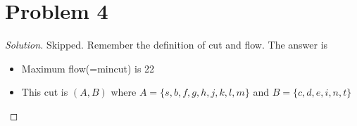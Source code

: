 \section*{Problem 4}
	\begin{proof} [Solution]
		Skipped. Remember the definition of cut and flow. The answer is
		\begin{itemize}
			\item Maximum flow(=mincut) is 22
			\item This cut is $(A, B)$ where $A = \{s, b, f, g, h, j, k, l, m\}$ and $B = 
			\{c, d, e, i, n, t\}$
		\end{itemize}
	\end{proof}